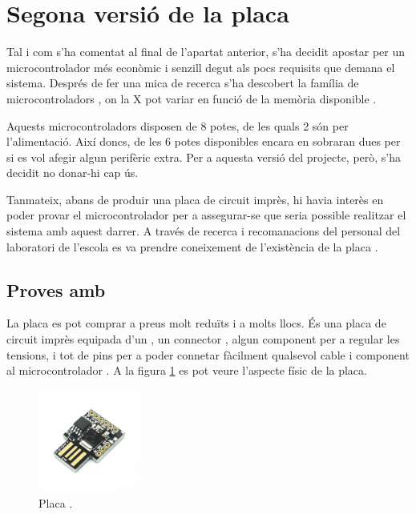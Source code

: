 \section{Segona versió de la placa}

Tal i com s'ha comentat al final de l'apartat anterior, s'ha decidit apostar
per un microcontrolador més econòmic i senzill degut als pocs requisits que
demana el sistema. Després de fer una mica de recerca s'ha descobert la
família de microcontroladors , on la X pot variar en funció de
la memòria  disponible \cite{AtTiny85}.

Aquests microcontroladors disposen de 8 potes, de les quals 2 són per
l'alimentació. Així doncs, de les 6 potes disponibles encara en sobraran dues
per si es vol afegir algun perifèric extra. Per a aquesta versió del projecte,
però, s'ha decidit no donar-hi cap ús.

Tanmateix, abans de produir una placa de circuit imprès, hi havia interès en
poder provar el microcontrolador per a assegurar-se que seria possible
realitzar el sistema amb aquest darrer. A través de recerca i recomanacions del
personal del laboratori de l'escola es va prendre coneixement de l'existència de
la placa .

\subsection{Proves amb }
\label{subsec:hw_digispark}

La placa  es pot comprar a preus molt reduïts i a molts llocs.
És una placa de circuit imprès equipada d'un , un connector
, algun component per a regular les tensions, i tot de pins per a
poder connetar fàcilment qualsevol cable i component al microcontrolador
\cite{Digispark}. A la figura \ref{fig:digispark} es pot veure l'aspecte físic
de la placa.

\begin{figure}[ht]
    \centering
    \includegraphics[width=0.3\textwidth]{images/modules/digisparkimg.png}
    \caption{Placa  \cite{Digispark}.}
    \label{fig:digispark}
\end{figure}

